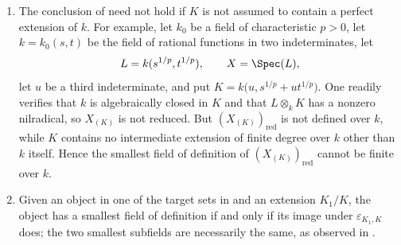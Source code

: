 \begin{remarks}[4.8.15]
\label{IV.4.8.15}
\begin{enumerate}
\item[\rm(i)]
\label{IV.4.8.15.i}
The conclusion of  need not hold if $K$ is not
assumed to contain a perfect extension of $k$.
For example, let $k_0$
be a field of characteristic $p>0$, let
$k=k_0(s,t)$ be the field of rational functions in two
indeterminates, let
\[
L=k(s^{1/p},t^{1/p}),
\qquad
X=\Spec(L),
\]
let $u$ be a third indeterminate, and put $K=k\bigl(u,s^{1/p}+ut^{1/p}\bigr)$.
One readily verifies that $k$ is algebraically closed in $K$ and that
$L\otimes_kK$ has a nonzero nilradical, so $X_{(K)}$ is not reduced.
But $(X_{(K)})_{\mathrm{red}}$ is not defined over $k$, while $K$
contains no intermediate extension of finite degree over $k$ other
than $k$ itself.
Hence the smallest field of definition of
$(X_{(K)})_{\mathrm{red}}$ cannot be finite over $k$.

\item[\rm(ii)]
\label{IV.4.8.15.ii}
Given an object in one of the target sets in  and an
extension $K_1/K$, the object has a smallest field of definition if
and only if its image under $\varepsilon_{K_1,K}$ does; the two smallest
subfields are necessarily the same, as observed in
.
\end{enumerate}
\end{remarks}
